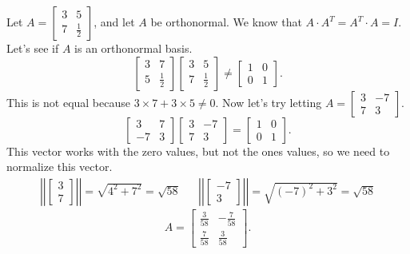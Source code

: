   \begin{problem}
    Let $A=\begin{bmatrix} 3&5\\7&\frac{1}{2} \end{bmatrix} $, and let $A$ be orthonormal. We know that $A\cdot A^{T}=A^{T}\cdot A=I$. Let's see if $A$ is an orthonormal basis.
    \[
      \begin{bmatrix} 3&7\\5&\frac{1}{2} \end{bmatrix} \begin{bmatrix} 3&5\\7&\frac{1}{2} \end{bmatrix} \neq \begin{bmatrix} 1&0\\0&1 \end{bmatrix} 
    .\] 
      This is not equal because $3\times 7+3\times 5\neq0$. Now let's try letting $A=\begin{bmatrix} 3&-7\\7&3 \end{bmatrix} $.
      \[
        \begin{bmatrix} 3&7\\-7&3 \end{bmatrix} \begin{bmatrix} 3&-7\\7&3 \end{bmatrix} =\begin{bmatrix} 1&0\\0&1 \end{bmatrix} 
      .\] 
      This vector works with the zero values, but not the ones values, so we need to normalize this vector.
      \begin{align*}
        \left| \left| \begin{bmatrix} 3\\7 \end{bmatrix}  \right|  \right|=\sqrt{4^2+7^2} =\sqrt{58} && \left| \left| \begin{bmatrix} -7\\3 \end{bmatrix}  \right|  \right|=\sqrt{(-7)^2+3^2} =\sqrt{58}
      \end{align*}
      \[
        A=\begin{bmatrix} \frac{3}{58}&-\frac{7}{58}\\\frac{7}{58}&\frac{3}{58} \end{bmatrix} 
      .\] 
  \end{problem}
  
